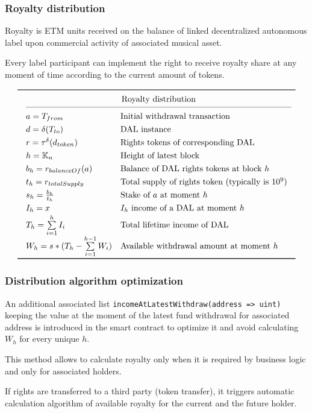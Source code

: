 \documentclass[12pt]{report}
\def\code#1{\colorbox{light-gray}{\texttt{#1}}}
\begin{document}
\subsubsection{Royalty distribution}
\label{tech-apps-dal-royalty}
\begin{multicols}{2}
Royalty is ETM units received on the balance of linked decentralized autonomous label upon commercial activity of associated musical asset.

Every label participant can implement the right to receive royalty share at any moment of time according to the current amount of tokens.
\end{multicols}
\begin{equation}
\def\arraystretch{1.3}
\begin{array}{@{}llll@{}}
\toprule
    & \multicolumn{2}{c@{}}{\text{Royalty distribution}} & \\
\cmidrule(l){2-3}
    & a = T_{from} & \text{Initial withdrawal transaction} & \\
    & d = \delta(T_{to}) & \text{DAL instance} & \\
    & r = \tau^\delta(d_{token}) & \text{Rights tokens of corresponding DAL} & \\
    & h = \mathbb{K}_n & \text{Height of latest block} & \\
    & b_h = r_{balanceOf}(a) & \text{Balance of DAL rights tokens at block } h & \\
    & t_h = r_{totalSupply} & \text{Total supply of rights token (typically is } 10^9 \text{)} & \\
    & s_h = \frac{b_h}{t_h} & \text{Stake of } a \text{ at moment } h & \\
    & I_h = x & I_h \text{ income of a DAL at moment } h & \\
    & T_h = \sum\limits^{h}_{i=1} I_i & \text{Total lifetime income of DAL} & \\
    & W_h = s * (T_h - \sum\limits^{h-1}_{i=1} W_i) & \text{Available withdrawal amount at moment } h & \\
\bottomrule
\end{array}
\end{equation}
\subsubsection{Distribution algorithm optimization}
\label{tech-apps-dal-royalty-optimization}
\begin{multicols}{2}
An additional associated list  \code{incomeAtLatestWithdraw(address => uint)} keeping the value at the moment of the latest fund withdrawal for associated address is introduced in the smart contract  to optimize it and avoid calculating $W_h$ for every unique $h$.

This method allows to calculate royalty only when it is required by business logic and only for associated holders.

If rights are transferred to a third party (token transfer), it triggers automatic calculation algorithm of available royalty for the current and the future holder.
\end{multicols}
\end{document}
